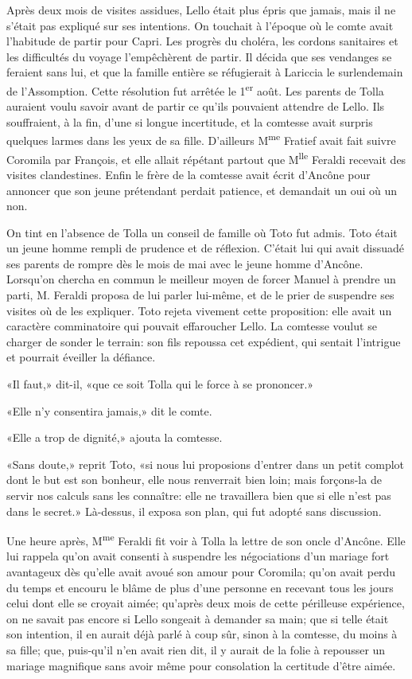 Après deux mois de visites assidues, Lello était plus épris que jamais,
mais il ne s'était pas expliqué sur ses intentions. On touchait à
l'époque où le comte avait l'habitude de partir pour Capri. Les progrès
du choléra, les cordons sanitaires et les difficultés du voyage
l'empêchèrent de partir. Il décida que ses vendanges se feraient sans
lui, et que la famille entière se réfugierait à Lariccia le surlendemain
de l'Assomption. Cette résolution fut arrêtée le 1\textsuperscript{er}
août. Les parents de Tolla auraient voulu savoir avant de partir ce
qu'ils pouvaient attendre de Lello. Ils souffraient, à la fin, d'une si
longue incertitude, et la comtesse avait surpris quelques larmes dans
les yeux de sa fille. D'ailleurs M\textsuperscript{me} Fratief avait
fait suivre Coromila par François, et elle allait répétant partout que
M\textsuperscript{lle} Feraldi recevait des visites clandestines. Enfin
le frère de la comtesse avait écrit d'Ancône pour annoncer que son jeune
prétendant perdait patience, et demandait un oui où un non.

On tint en l'absence de Tolla un conseil de famille où Toto fut admis.
Toto était un jeune homme rempli de prudence et de réflexion. C'était
lui qui avait dissuadé ses parents de rompre dès le mois de mai avec le
jeune homme d'Ancône. Lorsqu'on chercha en commun le meilleur moyen de
forcer Manuel à prendre un parti, M. Feraldi proposa de lui parler
lui-même, et de le prier de suspendre ses visites où de les expliquer.
Toto rejeta vivement cette proposition: elle avait un caractère
comminatoire qui pouvait effaroucher Lello. La comtesse voulut se
charger de sonder le terrain: son fils repoussa cet expédient, qui
sentait l'intrigue et pourrait éveiller la défiance.

«Il faut,» dit-il, «que ce soit Tolla qui le force à se prononcer.»

«Elle n'y consentira jamais,» dit le comte.

«Elle a trop de dignité,» ajouta la comtesse.

«Sans doute,» reprit Toto, «si nous lui proposions d'entrer dans un
petit complot dont le but est son bonheur, elle nous renverrait bien
loin; mais forçons-la de servir nos calculs sans les connaître: elle ne
travaillera bien que si elle n'est pas dans le secret.» Là-dessus, il
exposa son plan, qui fut adopté sans discussion.

Une heure après, M\textsuperscript{me} Feraldi fit voir à Tolla la
lettre de son oncle d'Ancône. Elle lui rappela qu'on avait consenti à
suspendre les négociations d'un mariage fort avantageux dès qu'elle
avait avoué son amour pour Coromila; qu'on avait perdu du temps et
encouru le blâme de plus d'une personne en recevant tous les jours celui
dont elle se croyait aimée; qu'après deux mois de cette périlleuse
expérience, on ne savait pas encore si Lello songeait à demander sa
main; que si telle était son intention, il en aurait déjà parlé à coup
sûr, sinon à la comtesse, du moins à sa fille; que, puis-qu'il n'en
avait rien dit, il y aurait de la folie à repousser un mariage
magnifique sans avoir même pour consolation la certitude d'être aimée.

